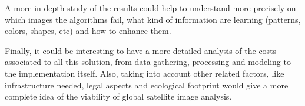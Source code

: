 A more in depth study of the results could help to understand more precisely on which images the algorithms fail, what kind of information are learning (patterns, colors, shapes, etc) and how to enhance them.

Finally, it could be interesting to have a more detailed analysis of the costs associated to all this solution, from data gathering, processing and modeling to the implementation itself. Also, taking into account other related factors, like infrastructure needed, legal aspects and ecological footprint \parencite{Strubell2019} would give a more complete idea of the viability of global satellite image analysis.
